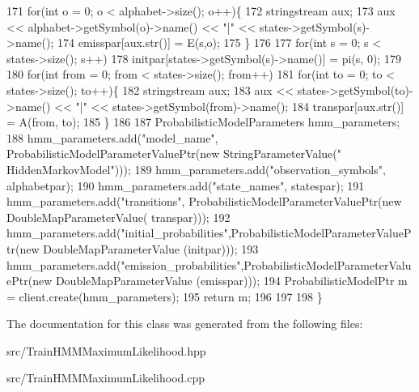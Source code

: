 \begin{DoxyCode}
171       \textcolor{keywordflow}{for}(\textcolor{keywordtype}{int} o = 0; o < alphabet->size(); o++)\{
172     stringstream aux;
173     aux << alphabet->getSymbol(o)->name() << \textcolor{stringliteral}{"|"} << states->getSymbol(s)->name();
174     emisspar[aux.str()] = E(s,o);
175       \}
176 
177     \textcolor{keywordflow}{for}(\textcolor{keywordtype}{int} s = 0; s < states->size(); s++) 
178       initpar[states->getSymbol(s)->name()] = pi(s, 0);
179 
180     \textcolor{keywordflow}{for}(\textcolor{keywordtype}{int} from = 0; from < states->size(); from++)
181       \textcolor{keywordflow}{for}(\textcolor{keywordtype}{int} to = 0; to < states->size(); to++)\{
182     stringstream aux;
183     aux << states->getSymbol(to)->name() << \textcolor{stringliteral}{"|"} << states->getSymbol(from)->name();
184     transpar[aux.str()] = A(from, to);
185       \}
186 
187     ProbabilisticModelParameters hmm\_parameters;
188     hmm\_parameters.add(\textcolor{stringliteral}{"model\_name"}, ProbabilisticModelParameterValuePtr(\textcolor{keyword}{new} StringParameterValue(\textcolor{stringliteral}{"
      HiddenMarkovModel"})));
189     hmm\_parameters.add(\textcolor{stringliteral}{"observation\_symbols"}, alphabetpar);
190     hmm\_parameters.add(\textcolor{stringliteral}{"state\_names"}, statespar);
191     hmm\_parameters.add(\textcolor{stringliteral}{"transitions"}, ProbabilisticModelParameterValuePtr(\textcolor{keyword}{new} DoubleMapParameterValue(
      transpar)));
192     hmm\_parameters.add(\textcolor{stringliteral}{"initial\_probabilities"},ProbabilisticModelParameterValuePtr(\textcolor{keyword}{new} 
      DoubleMapParameterValue (initpar)));
193     hmm\_parameters.add(\textcolor{stringliteral}{"emission\_probabilities"},ProbabilisticModelParameterValuePtr(\textcolor{keyword}{new} 
      DoubleMapParameterValue (emisspar)));
194     ProbabilisticModelPtr m = client.create(hmm\_parameters);
195     \textcolor{keywordflow}{return} m;
196 
197 
198   \}
\end{DoxyCode}


The documentation for this class was generated from the following files\+:\begin{DoxyCompactItemize}
\item 
src/Train\+H\+M\+M\+Maximum\+Likelihood.\+hpp\item 
src/Train\+H\+M\+M\+Maximum\+Likelihood.\+cpp\end{DoxyCompactItemize}
